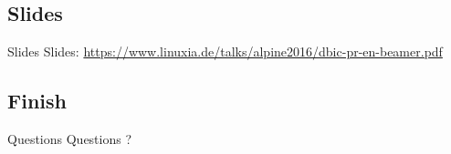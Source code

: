 \subsection{Slides}

\begin{frame}{Slides}
Slides:
\url{https://www.linuxia.de/talks/alpine2016/dbic-pr-en-beamer.pdf}
\end{frame}

\subsection{Finish}

\begin{frame}{Questions}
\centering
Questions ?
\end{frame}



